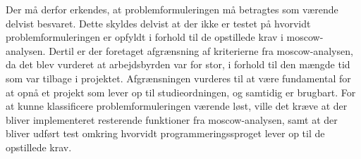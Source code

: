 Der må derfor erkendes, at problemformuleringen må betragtes som værende delvist besvaret.
Dette skyldes delvist at der ikke er testet på hvorvidt problemformuleringen er opfyldt i forhold til de opstillede krav i \gls{moscow}-analysen.
Dertil er der foretaget afgrænsning af kriterierne fra \gls{moscow}-analysen, da det blev vurderet at arbejdsbyrden var for stor, i forhold til den mængde tid som var tilbage i projektet.
Afgrænsningen vurderes til at være fundamental for at opnå et projekt som lever op til studieordningen, og samtidig er brugbart.
For at kunne klassificere problemformuleringen værende løst, ville det kræve at der bliver implementeret resterende funktioner fra \gls{moscow}-analysen, samt at der bliver udført test omkring hvorvidt programmeringssproget lever op til de opstillede krav.






